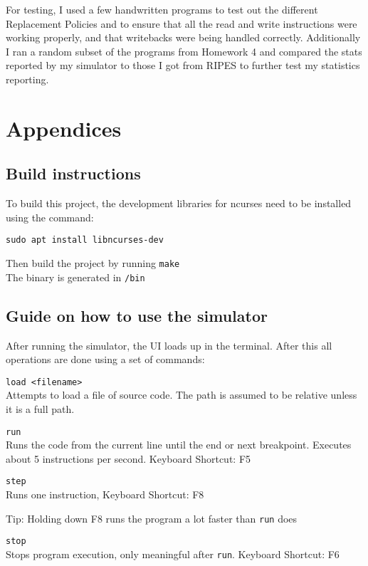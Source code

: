\documentclass[12pt]{article}
\begin{document}
	For testing, I used a few handwritten programs to test out the different Replacement Policies and to ensure that all the read and write instructions were working properly, and that writebacks were being handled correctly. Additionally I ran a random subset of the programs from Homework 4 and compared the stats reported by my simulator to those I got from RIPES to further test my statistics reporting.

	\newpage
	\appendix
	\section{Appendices}
	
	\subsection{Build instructions}

	To build this project, the development libraries for ncurses need to be installed using the command:

	\verb|sudo apt install libncurses-dev|	

	Then build the project by running \verb|make|\\
	The binary is generated in \verb|/bin|

	\subsection{Guide on how to use the simulator}

	After running the simulator, the UI loads up in the terminal. After this all operations are done using a set of commands:

	\verb|load <filename>|\\
	Attempts to load a file of source code. The path is assumed to be relative unless it is a full path.
	
	\verb|run|\\
	Runs the code from the current line until the end or next breakpoint. Executes about 5 instructions per second. Keyboard Shortcut: F5

	\verb|step|\\
	Runs one instruction, Keyboard Shortcut: F8

	Tip: Holding down F8 runs the program a lot faster than \verb|run| does

	\verb|stop|\\
	Stops program execution, only meaningful after \verb|run|. Keyboard Shortcut: F6
\end{document}

